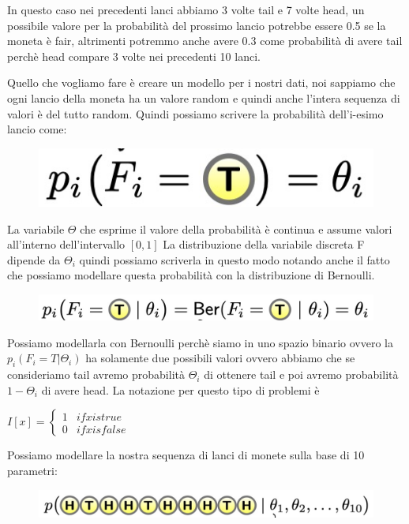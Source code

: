 \documentclass[14pt]{extreport}
\begin{document}
In questo caso nei precedenti lanci abbiamo 3 volte tail e 7 volte head, un possibile valore per la probabilità del prossimo lancio potrebbe essere
0.5 se la moneta è fair, altrimenti potremmo anche avere 0.3 come probabilità di avere tail perchè head compare 3 volte nei precedenti 10 lanci.

Quello che vogliamo fare è creare un modello per i nostri dati, noi sappiamo che ogni lancio della moneta ha un valore random e quindi anche l'intera
sequenza di valori è del tutto random. Quindi possiamo scrivere la probabilità dell'i-esimo lancio come: 
\begin{figure}[H]
\centering
  \includegraphics[width=0.3\linewidth]{7.jpeg}
\end{figure}

La variabile $\Theta$ che esprime il valore della probabilità è continua e assume valori all'interno dell'intervallo $[0,1]$ La distribuzione della
variabile discreta F dipende da $\Theta_i$ quindi possiamo scriverla in questo modo notando anche il fatto che possiamo modellare questa probabilità
con la distribuzione di Bernoulli.
\begin{figure}[H]
\centering
  \includegraphics[width=0.6\linewidth]{8.jpeg}
\end{figure}

Possiamo modellarla con Bernoulli perchè siamo in uno spazio binario ovvero la $p_i(F_i = T | \Theta_i)$ ha solamente due possibili valori ovvero
abbiamo che se consideriamo tail avremo probabilità $\Theta_i$ di ottenere tail e poi avremo probabilità $1-\Theta_i$ di avere head. La notazione per
questo tipo di problemi è 

$I[x] = \begin{cases*} 1 & if  x is true  \\
                    0 & if 	x is false \end{cases*}$

Possiamo modellare la nostra sequenza di lanci di monete sulla base di 10 parametri:
\begin{figure}[H]
\centering
  \includegraphics[width=0.8\linewidth]{9.jpeg}
\end{figure}
\end{document}
